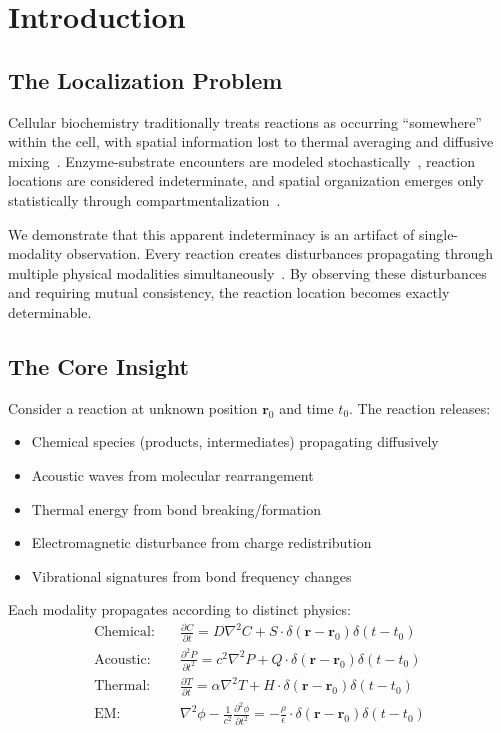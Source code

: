 \documentclass[11pt,a4paper]{article}
\theoremstyle{remark}
\newcommand{\rxnpos}{\mathbf{r}_0}
\newcommand{\rxntime}{t_0}
\begin{document}
\tableofcontents
\newpage

\section{Introduction}

\subsection{The Localization Problem}

Cellular biochemistry traditionally treats reactions as occurring ``somewhere'' within the cell, with spatial information lost to thermal averaging and diffusive mixing~\citep{berg1993random}. Enzyme-substrate encounters are modeled stochastically~\citep{elf2007probing}, reaction locations are considered indeterminate, and spatial organization emerges only statistically through compartmentalization~\citep{srere1987complexes}.

We demonstrate that this apparent indeterminacy is an artifact of single-modality observation. Every reaction creates disturbances propagating through multiple physical modalities simultaneously~\citep{Sachikonye2025_CellularState}. By observing these disturbances and requiring mutual consistency, the reaction location becomes exactly determinable.

\subsection{The Core Insight}

Consider a reaction at unknown position $\rxnpos$ and time $\rxntime$. The reaction releases:
\begin{itemize}
    \item Chemical species (products, intermediates) propagating diffusively
    \item Acoustic waves from molecular rearrangement
    \item Thermal energy from bond breaking/formation
    \item Electromagnetic disturbance from charge redistribution
    \item Vibrational signatures from bond frequency changes
\end{itemize}

Each modality propagates according to distinct physics:
\begin{align}
    \text{Chemical:} \quad & \frac{\partial C}{\partial t} = D\nabla^2 C + S \cdot \delta(\mathbf{r} - \rxnpos)\delta(t - \rxntime) \\
    \text{Acoustic:} \quad & \frac{\partial^2 P}{\partial t^2} = c^2\nabla^2 P + Q \cdot \delta(\mathbf{r} - \rxnpos)\delta(t - \rxntime) \\
    \text{Thermal:} \quad & \frac{\partial T}{\partial t} = \alpha\nabla^2 T + H \cdot \delta(\mathbf{r} - \rxnpos)\delta(t - \rxntime) \\
    \text{EM:} \quad & \nabla^2\phi - \frac{1}{c^2}\frac{\partial^2\phi}{\partial t^2} = -\frac{\rho}{\epsilon} \cdot \delta(\mathbf{r} - \rxnpos)\delta(t - \rxntime)
\end{align}
\end{document}

